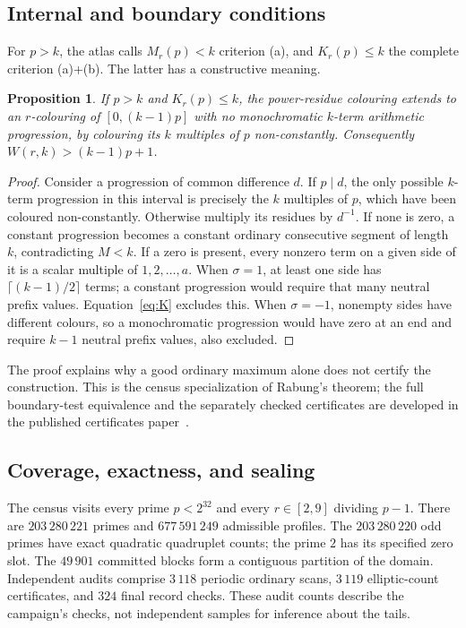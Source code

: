 \documentclass[11pt]{article}
\newtheorem{proposition}[theorem]{Proposition}
\theoremstyle{definition}\newtheorem{definition}[theorem]{Definition}
\begin{document}
\subsection{Internal and boundary conditions}
For $p>k$, the atlas calls $M_r(p)<k$ criterion (a), and
$K_r(p)\le k$ the complete criterion (a)+(b). The latter has a
constructive meaning.
\begin{proposition}\label{prop:rabung}
If $p>k$ and $K_r(p)\le k$, the power-residue colouring extends to an
$r$-colouring of $[0,(k-1)p]$ with no monochromatic $k$-term arithmetic
progression, by colouring its $k$ multiples of $p$ non-constantly.
Consequently $W(r,k)>(k-1)p+1$.
\end{proposition}
\begin{proof}
Consider a progression of common difference $d$. If $p\mid d$, the
only possible $k$-term progression in this interval is precisely the
$k$ multiples of $p$, which have been coloured non-constantly.
Otherwise multiply its residues by $d^{-1}$. If none is zero, a constant
progression becomes a constant ordinary consecutive segment of length
$k$, contradicting $M<k$. If a zero is present, every nonzero term on a
given side of it is a scalar multiple of $1,2,\ldots,a$. When
$\sigma=1$, at least one side has $\lceil(k-1)/2\rceil$ terms; a
constant progression would require that many neutral prefix values.
Equation~\eqref{eq:K} excludes this. When $\sigma=-1$, nonempty sides
have different colours, so a monochromatic progression would have zero
at an end and require $k-1$ neutral prefix values, also excluded.
\end{proof}
The proof explains why a good ordinary maximum alone does not certify
the construction. This is the census specialization of Rabung's theorem;
the full boundary-test equivalence and the separately checked certificates
are developed in the published certificates paper~\cite{boundsv2}.

\subsection{Coverage, exactness, and sealing}
The census visits every prime $p<2^{32}$ and every $r\in[2,9]$ dividing
$p-1$. There are $203\,280\,221$ primes and $677\,591\,249$ admissible
profiles. The $203\,280\,220$ odd primes have exact quadratic
quadruplet counts; the prime $2$ has its specified zero slot.
The $49\,901$ committed blocks form a contiguous partition of the
domain. Independent audits comprise $3\,118$ periodic ordinary scans,
$3\,119$ elliptic-count certificates, and $324$ final record checks.
These audit counts describe the campaign's checks, not independent
samples for inference about the tails.
\end{document}
